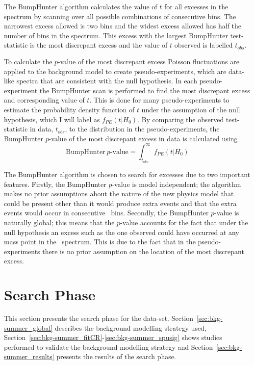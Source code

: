 The BumpHunter algorithm calculates the value of $t$ for all excesses in the~\mjj{} spectrum
by scanning over all possible combinations of consecutive bins.
The narrowest excess allowed is two bins and the widest excess allowed has half the number of bins in the spectrum.
This excess with the largest BumpHunter test-statistic is the most discrepant excess and the value of $t$ observed is labelled $t_{obs}$.

To calculate the $p$-value of the most discrepant excess
Poisson fluctuations are applied to the background model to create pseudo-experiments,
which are data-like spectra that are consistent with the null hypothesis.
In each pseudo-experiment the BumpHunter scan is performed to find the most discrepant excess and corresponding value of $t$.
This is done for many pseudo-experiments to estimate the probability density function of $t$ under the assumption of the null hypothesis,
which I will label as $f_{PE}(t| H_0)$.
By comparing the observed test-statistic in data, $t_{obs}$,
to the distribution in the pseudo-experiments,
the BumpHunter $p$-value of the most discrepant excess in data is calculated using
\begin{equation}
  \text{BumpHunter}~p\text{-value} = \int_{t_{obs}}^\infty f_{PE}(t | H_0)
\end{equation}

The BumpHunter algorithm is chosen to search for excesses due to two important features.
Firstly, the BumpHunter $p$-value is model independent;
the algorithm makes no prior assumptions about the nature of the new physics model that could be present
other than it would produce extra events and that the extra events would occur in consecutive~\mjj{} bins.
Secondly, the BumpHunter $p$-value is naturally global;
this means that the $p$-value accounts for the fact that under the null hypothesis an excess such as the one observed could have occurred at any mass point in the~\mjj{} spectrum.
This is due to the fact that in the pseudo-experiments there is no prior assumption on the location of the most discrepant excess.

\section{\summer{} Search Phase}
\label{sec:bkg-summer}

This section presents the search phase for the \summer{} data-set.
Section~\ref{sec:bkg-summer_global} describes the background modelling strategy used,
Section~\ref{sec:bkg-summer_fitCR}-\ref{sec:bkg-summer_spusig}
shows studies performed to validate the background modelling strategy
and Section~\ref{sec:bkg-summer_results} presents the results of the search phase.

